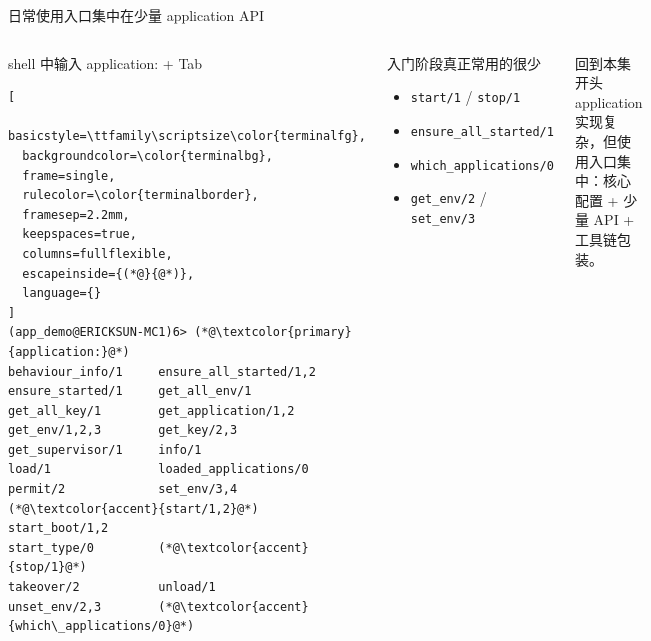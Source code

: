 \documentclass[aspectratio=169, 9pt]{beamer}
\newcommand{\code}[1]{\texttt{#1}}
\begin{document}
\begin{frame}[fragile]{日常使用入口集中在少量 application API}
  \begin{columns}[T,onlytextwidth]
    \begin{block}{shell 中输入 application: + Tab}
\begin{lstlisting}[
  basicstyle=\ttfamily\scriptsize\color{terminalfg},
  backgroundcolor=\color{terminalbg},
  frame=single,
  rulecolor=\color{terminalborder},
  framesep=2.2mm,
  keepspaces=true,
  columns=fullflexible,
  escapeinside={(*@}{@*)},
  language={}
]
(app_demo@ERICKSUN-MC1)6> (*@\textcolor{primary}{application:}@*)
behaviour_info/1     ensure_all_started/1,2
ensure_started/1     get_all_env/1
get_all_key/1        get_application/1,2
get_env/1,2,3        get_key/2,3
get_supervisor/1     info/1
load/1               loaded_applications/0
permit/2             set_env/3,4
(*@\textcolor{accent}{start/1,2}@*)          start_boot/1,2
start_type/0         (*@\textcolor{accent}{stop/1}@*)
takeover/2           unload/1
unset_env/2,3        (*@\textcolor{accent}{which\_applications/0}@*)
\end{lstlisting}
    \end{block}
    \footnotesize
    \begin{exampleblock}{入门阶段真正常用的很少}
      \begin{itemize}
        \item \code{start/1} / \code{stop/1}
        \item \code{ensure\_all\_started/1}
        \item \code{which\_applications/0}
        \item \code{get\_env/2} / \code{set\_env/3}
      \end{itemize}
    \end{exampleblock}
    \vspace{0.2cm}
    \begin{alertblock}{回到本集开头}
      application 实现复杂，但使用入口集中：核心配置 + 少量 API + 工具链包装。
    \end{alertblock}
  \end{columns}
\end{frame}
\end{document}
